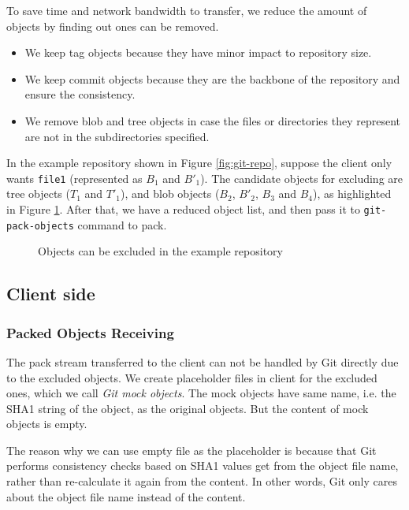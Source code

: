 \documentclass[preprint]{sigplanconf}
\begin{document}
To save time and network bandwidth to transfer, we reduce the amount of objects
by finding out ones can be removed.
\begin{itemize}
  \item We keep tag objects because they have minor impact to repository size.
  \item We keep commit objects because they are the backbone of the repository
    and ensure the consistency.
  \item We remove blob and tree objects in case the files or directories they
    represent are not in the subdirectories specified.
\end{itemize}

In the example repository shown in Figure \ref{fig:git-repo}, suppose the
client only wants \verb|file1| (represented as $B_1$ and $B'_1$).
The candidate objects for excluding are tree objects ($T_1$ and $T'_1$), and
blob objects ($B_2$, $B'_2$, $B_3$ and $B_4$), as highlighted in Figure
\ref{fig:find-obj-to-remove}.
After that, we have a reduced object list, and then pass it to
\verb|git-pack-objects| command to pack.
\begin{figure}[htpb]
  \centering
  
  \caption{Objects can be excluded in the example repository}
  \label{fig:find-obj-to-remove}
\end{figure}


\subsection{Client side}
\subsubsection{Packed Objects Receiving}
The pack stream transferred to the client can not be handled by Git directly
due to the excluded objects.
We create placeholder files in client for the excluded ones, which we call
\emph{Git mock objects}.
The mock objects have same name, i.e. the SHA1 string of the object, as the
original objects.
But the content of mock objects is empty.

The reason why we can use empty file as the placeholder is because that Git
performs consistency checks based on SHA1 values get from the object file name,
rather than re-calculate it again from the content.
In other words, Git only cares about the object file name instead of the
content.
\end{document}
